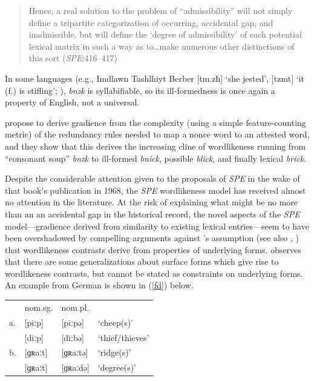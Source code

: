 \begin{quote}
Hence, a real solution to the problem of ``admissibility'' will not simply define a tripartite categorization of occurring, accidental gap, and inadmissible, but will define the `degree of admissibility' of each potential lexical matrix in such a way as to\ldots{}make numerous other distinctions of this sort (\emph{SPE}:416--417)
\end{quote}

In some languages (e.g., Imdlawn Tashlhiyt Berber [tm.zħ] `she jested', [tzmt] `it (f.) is stifling'; \citealt{Dell1985}), \emph{bnzk} is syllabifiable, so its ill-formedness is once again a property of English, not a universal.

\citeauthor{SPE} propose to derive gradience from the complexity (using a simple feature-counting metric) of the redundancy rules needed to map a nonce word to an attested word, and they show that this derives the increasing cline of wordlikeness running from ``consonant soup'' \emph{bnzk} to ill-formed \emph{bnick}, possible \emph{blick}, and finally lexical \emph{brick}.

Despite the considerable attention given to the proposals of \emph{SPE} in the wake of that book's publication in 1968, the \emph{SPE} wordlikeness model has received almost no attention in the literature. At the risk of explaining what might be no more than an an accidental gap in the historical record, the novel aspects of the \emph{SPE} model---gradience derived from similarity to existing lexical entries---seem to have been overshadowed by compelling arguments against \citeauthor{SPE}'s assumption (see also \citealt{Halle1962}, \citealt{Stanley1967}) that wordlikeness contrasts derive from properties of underlying forms. \citet{Shibatani1973} observes that there are some generalizations about surface forms which give rise to wordlikeness contrasts, but cannot be stated as constraints on underlying forms. An example from German is shown in (\ref{fd}) below.

\begin{example} \label{fd}
\begin{tabular}{l l l l}
   & nom.sg. & nom.pl.    \\
a. & [piːp]    & [piːpə]  & `cheep(s)'      \\
   & [diːp]    & [diːbə]  & `thief/thieves' \\
b. & [ɡʀaːt]   & [ɡʀaːtə] & `ridge(s)'      \\
   & [ɡʀaːt]   & [ɡʀaːdə] & `degree(s)'     \\
\end{tabular}
\end{example}

